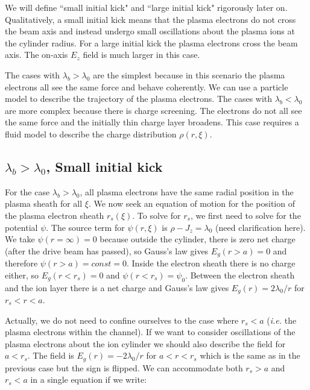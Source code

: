 \documentclass[aps,prl,preprint,groupedaddress]{revtex4-1}
\begin{document}
We will define ``small initial kick" and ``large initial kick" rigorously later on. Qualitatively, a small initial kick means that the plasma electrons do not cross the beam axis and instead undergo small oscillations about the plasma ions at the cylinder radius. For a large initial kick the plasma electrons cross the beam axis. The on-axis $E_z$ field is much larger in this case.

The cases with $\lambda_b > \lambda_0$ are the simplest because in this scenario the plasma electrons all see the same force and behave coherently. We can use a particle model to describe the trajectory of the plasma electrons. The cases with $\lambda_b < \lambda_0$ are more complex because there is charge screening. The electrons do not all see the same force and the initially thin charge layer broadens. This case requires a fluid model to describe the charge distribution $\rho(r,\xi)$.







\subsection{$\lambda_b > \lambda_0$, Small initial kick}

For the case $\lambda_b > \lambda_0$, all plasma electrons have the same radial position in the plasma sheath for all $\xi$. We now seek an equation of motion for the position of the plasma electron sheath $r_s(\xi)$. To solve for $r_s$, we first need to solve for the potential $\psi$. The source term for $\psi(r,\xi)$ is $\rho - J_z = \lambda_0$ (need clarification here). We take $\psi(r=\infty) = 0$ because outside the cylinder, there is zero net charge (after the drive beam has passed), so Gauss's law gives $E_g(r > a) = 0$ and therefore $\psi(r > a) = const = 0$. Inside the electron sheath there is no charge either, so $E_g(r < r_s) = 0$ and $\psi(r < r_s) = \psi_0$. Between the electron sheath and the ion layer there is a net charge and Gauss's law gives $E_g(r) = 2\lambda_0/r$ for $r_s < r < a$. 

Actually, we do not need to confine ourselves to the case where $r_s < a$ (\emph{i.e.} the plasma electrons within the channel). If we want to consider oscillations of the plasma electrons about the ion cylinder we should also describe the field for $a <  r_s$. The field is $E_g(r) = -2\lambda_0/r$ for $a < r < r_s$  which is the same as in the previous case but the sign is flipped. We can accommodate both $r_s > a$ and $r_s < a$ in a single equation if we write:
\end{document}
